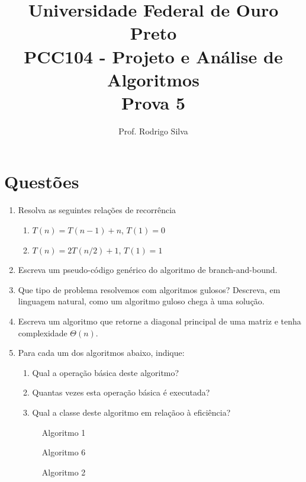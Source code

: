 \documentclass{article}
\title{\vspace{-2 cm}Universidade Federal de Ouro Preto \\ PCC104 - Projeto e Análise de Algoritmos \\ Prova 5}
\author{Prof. Rodrigo Silva}
\begin{document}
\maketitle

\section*{Questões}

\begin{enumerate}

    \item Resolva as seguintes relações de recorrência
    
    \begin{enumerate}
        \item $T(n) = T(n-1) + n$, $T(1)=0$
        \item $T(n) = 2T(n/2) + 1$, $T(1)=1$
    \end{enumerate}

    \item Escreva um pseudo-código genérico do algoritmo de branch-and-bound.
    
    \item Que tipo de problema resolvemos com algoritmos gulosos? Descreva, em linguagem natural, como um algoritmo guloso chega à uma solução. 

   

    \item Escreva um algoritmo que retorne a diagonal principal de uma matriz e tenha complexidade $\Theta(n)$.

    \item Para cada um dos algoritmos abaixo, indique:
    
    \begin{enumerate}
        \item Qual a operação básica deste algoritmo?
        \item Quantas vezes esta operação básica é executada?
        \item Qual a classe deste algoritmo em relaçãoo à eficiência?
    \end{enumerate}


    \begin{figure}[!ht]
        
        \caption{Algoritmo 1}
    \end{figure}

    \begin{figure}[!ht]
        
        \caption{Algoritmo 6}
    \end{figure}    

    \begin{figure}[!ht]
        
        \caption{Algoritmo 2}
    \end{figure}

      
    
\end{enumerate}



%
%
\end{document}
